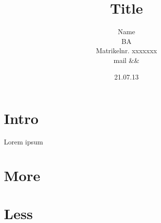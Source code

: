 \documentclass[a4paper, 12pt, bibtotoc]{scrartcl} %
\title{Title}
\date{21.07.13 \\ }
\author{Name \\ BA  \\ Matrikelnr. xxxxxxx \\ mail &&}
\begin{document}
\pagestyle{scrheadings}
\maketitle
\clearpage
\tableofcontents
\thispagestyle{empty}  %
\pagebreak
\setcounter{page}{1}

\section{Intro}
Lorem ipsum

\section{More}

\section{Less}

\clearpage


\end{document}
